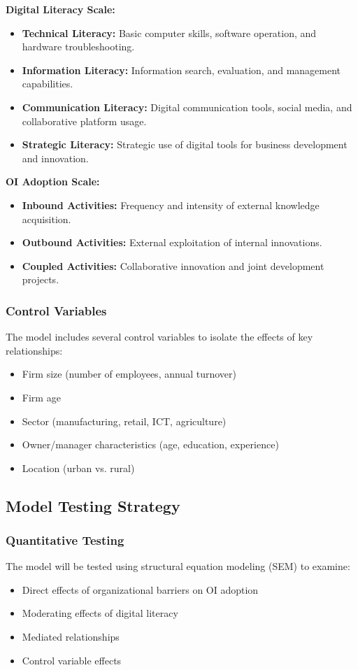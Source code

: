 \textbf{Digital Literacy Scale:}
\begin{itemize}
    \item \textbf{Technical Literacy:} Basic computer skills, software operation, and hardware troubleshooting.
    \item \textbf{Information Literacy:} Information search, evaluation, and management capabilities.
    \item \textbf{Communication Literacy:} Digital communication tools, social media, and collaborative platform usage.
    \item \textbf{Strategic Literacy:} Strategic use of digital tools for business development and innovation.
\end{itemize}

\textbf{OI Adoption Scale:}
\begin{itemize}
    \item \textbf{Inbound Activities:} Frequency and intensity of external knowledge acquisition.
    \item \textbf{Outbound Activities:} External exploitation of internal innovations.
    \item \textbf{Coupled Activities:} Collaborative innovation and joint development projects.
\end{itemize}

\subsubsection{Control Variables}
The model includes several control variables to isolate the effects of key relationships:
\begin{itemize}
    \item Firm size (number of employees, annual turnover)
    \item Firm age
    \item Sector (manufacturing, retail, ICT, agriculture)
    \item Owner/manager characteristics (age, education, experience)
    \item Location (urban vs. rural)
\end{itemize}

\subsection{Model Testing Strategy}

\subsubsection{Quantitative Testing}
The model will be tested using structural equation modeling (SEM) to examine:
\begin{itemize}
    \item Direct effects of organizational barriers on OI adoption
    \item Moderating effects of digital literacy
    \item Mediated relationships
    \item Control variable effects
\end{itemize}

